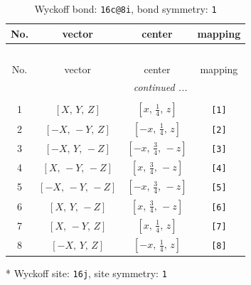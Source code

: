 \documentclass[fleqn,8pt]{jsarticle}
\begin{document}
\renewcommand{\arraystretch}{1.2}
\begin{longtable}{cccc}
\caption{Wyckoff bond: {\tt 16c@8i}, bond symmetry: {\tt 1}}
 \\
 \hline \hline
No. & vector & center & mapping \\ \hline \endfirsthead

\multicolumn{3}{l}{\tablename\ \thetable{}} \\
 \hline \hline
No. & vector & center & mapping \\ \hline \endhead

 \hline \hline
\multicolumn{3}{r}{\footnotesize\it continued ...} \\ \endfoot

 \hline \hline
\multicolumn{3}{r}{} \\ \endlastfoot

1 & $\left[ X,\, Y,\, Z \right]$ & $\left[ x,\, \frac{1}{4},\, z \right]$ & {\tt [1]} \\ \hline
2 & $\left[ - X,\, - Y,\, Z \right]$ & $\left[ - x,\, \frac{1}{4},\, z \right]$ & {\tt [2]} \\ \hline
3 & $\left[ - X,\, Y,\, - Z \right]$ & $\left[ - x,\, \frac{3}{4},\, - z \right]$ & {\tt [3]} \\ \hline
4 & $\left[ X,\, - Y,\, - Z \right]$ & $\left[ x,\, \frac{3}{4},\, - z \right]$ & {\tt [4]} \\ \hline
5 & $\left[ - X,\, - Y,\, - Z \right]$ & $\left[ - x,\, \frac{3}{4},\, - z \right]$ & {\tt [5]} \\ \hline
6 & $\left[ X,\, Y,\, - Z \right]$ & $\left[ x,\, \frac{3}{4},\, - z \right]$ & {\tt [6]} \\ \hline
7 & $\left[ X,\, - Y,\, Z \right]$ & $\left[ x,\, \frac{1}{4},\, z \right]$ & {\tt [7]} \\ \hline
8 & $\left[ - X,\, Y,\, Z \right]$ & $\left[ - x,\, \frac{1}{4},\, z \right]$ & {\tt [8]} \\
\end{longtable}
* Wyckoff site: {\tt 16j}, site symmetry: {\tt 1}
\renewcommand{\arraystretch}{1.2}
\end{document}
